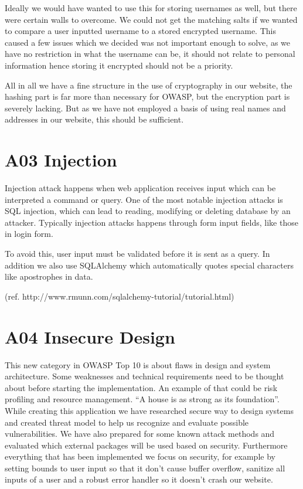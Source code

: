 Ideally we would have wanted to use this for storing usernames as well, but there were certain walls to overcome. We could not get the matching salts if we wanted to compare a user inputted username to a stored encrypted username. This caused a few issues which we decided was not important enough to solve, as we have no restriction in what the username can be, it should not relate to personal information hence storing it encrypted should not be a priority. 

All in all we have a fine structure in the use of cryptography in our website, the hashing part is far more than necessary for OWASP, but the encryption part is severely lacking. But as we have not employed a basis of using real names and addresses in our website, this should be sufficient. 

\section{A03 Injection}

Injection attack happens when web application receives input which can be interpreted a command or query. One of the most notable injection attacks is SQL injection, which can lead to reading, modifying or deleting database by an attacker. Typically injection attacks happens through form input fields, like those in login form.

To avoid this, user input must be validated before it is sent as a query. In addition we also use SQLAlchemy which automatically quotes special characters like apostrophes in data.

(ref. http://www.rmunn.com/sqlalchemy-tutorial/tutorial.html) %

\section{A04 Insecure Design}

This new category in OWASP Top 10 is about flaws in design and system architecture. Some weaknesses and technical requirements need to be thought about before starting the implementation. An example of that could be risk profiling and resource management. “A house is as strong as its foundation”. 
While creating this application we have researched secure way to design systems and created threat model to help us recognize and evaluate possible vulnerabilities. We have also prepared for some known attack methods and evaluated which external packages will be used based on security. Furthermore everything that has been implemented we focus on security, for example by setting bounds to user input so that it don’t cause buffer overflow, sanitize all inputs of a user and a robust error handler so it doesn’t crash our website. 

